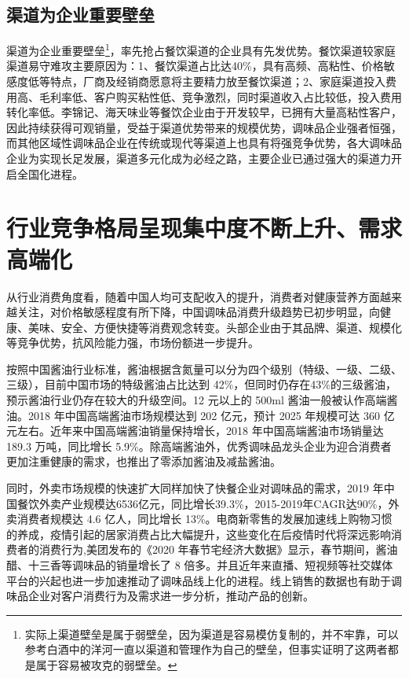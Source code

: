 \documentclass[UTF8,a4paper,zihao=-4,fontset = windows]{ctexart} %
\begin{document}
\subsection{渠道为企业重要壁垒}
渠道为企业重要壁垒\footnote{实际上渠道壁垒是属于弱壁垒，因为渠道是容易模仿复制的，并不牢靠，可以参考白酒中的洋河一直以渠道和管理作为自己的壁垒，但事实证明了这两者都是属于容易被攻克的弱壁垒。}，率先抢占餐饮渠道的企业具有先发优势。餐饮渠道较家庭渠道易守难攻主要原因为：1、餐饮渠道占比达40\%，具有高频、高粘性、价格敏感度低等特点，厂商及经销商愿意将主要精力放至餐饮渠道；2、家庭渠道投入费用高、毛利率低、客户购买粘性低、竞争激烈，同时渠道收入占比较低，投入费用转化率低。李锦记、海天味业等餐饮企业由于开发较早，已拥有大量高粘性客户，因此持续获得可观销量，受益于渠道优势带来的规模优势，调味品企业强者恒强，而其他区域性调味品企业在传统或现代等渠道上也具有将强竞争优势，各大调味品企业为实现长足发展，渠道多元化成为必经之路，主要企业已通过强大的渠道力开启全国化进程。
\section{行业竞争格局呈现集中度不断上升、需求高端化}
从行业消费角度看，随着中国人均可支配收入的提升，消费者对健康营养方面越来越关注，对价格敏感程度有所下降，中国调味品消费升级趋势已初步明显，向健康、美味、安全、方便快捷等消费观念转变。头部企业由于其品牌、渠道、规模化等竞争优势，抗风险能力强，市场份额进一步提升。


按照中国酱油行业标准，酱油根据含氮量可以分为四个级别（特级、一级、二级、三级），目前中国市场的特级酱油占比达到 42\%，但同时仍存在43\%的三级酱油，预示酱油行业仍存在较大的升级空间。12 元以上的 500ml 酱油一般被认作高端酱油。2018 年中国高端酱油市场规模达到 202 亿元，预计 2025 年规模可达 360 亿元左右。近年来中国高端酱油销量保持增长，2018 年中国高端酱油市场销量达 189.3 万吨，同比增长 5.9\%。除高端酱油外，优秀调味品龙头企业为迎合消费者更加注重健康的需求，也推出了零添加酱油及减盐酱油。


同时，外卖市场规模的快速扩大同样加快了快餐企业对调味品的需求，2019 年中国餐饮外卖产业规模达6536亿元，同比增长39.3\%，2015-2019年CAGR达90\%，外卖消费者规模达 4.6 亿人，同比增长 13\%。电商新零售的发展加速线上购物习惯的养成，疫情引起的居家消费占比大幅提升，这些变化在后疫情时代将深远影响消费者的消费行为,美团发布的《2020 年春节宅经济大数据》显示，春节期间，酱油醋、十三香等调味品的销量增长了 8 倍多。并且近年来直播、短视频等社交媒体平台的兴起也进一步加速推动了调味品线上化的进程。线上销售的数据也有助于调味品企业对客户消费行为及需求进一步分析，推动产品的创新。
\end{document}
